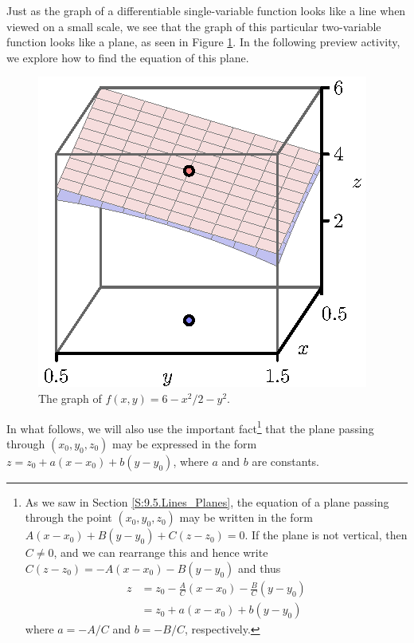 Just as the graph of a differentiable single-variable function looks like a line
when viewed on a small scale, we see that the graph of this particular two-variable
function looks like a plane, as seen in Figure \ref{F:10.4.tangent.4}.
In the following preview activity, we explore how to find the equation of this plane.

\begin{figure}[ht]
  \begin{center}
    \includegraphics{figures/fig_10_4_tangent_4.eps}
  \end{center}
  \caption{The graph of $f(x,y)=6-x^2/2 - y^2$.}
  \label{F:10.4.tangent.4}
\end{figure}

In what follows, we will also use the important fact\footnote{As we saw in Section \ref{S:9.5.Lines_Planes}, the equation
  of a plane passing through the point $(x_0, y_0, z_0)$ may be written
  in the form $A(x-x_0) + B(y-y_0) + C(z-z_0) = 0$.  If the
  plane is not vertical, then $C\neq 0$, and we can
  rearrange this and hence write
$
    C(z-z_0) = -A(x-x_0) - B(y-y_0) 
$
and thus
\begin{align*}
    z & = z_0-\frac AC(x-x_0) - \frac BC(y-y_0) \\
      & = z_0 + a(x-x_0) + b(y-y_0)
  \end{align*}
  where $a=-A/C$ and $b=-B/C$, respectively.} that the plane passing through $(x_0, y_0, z_0)$ may be expressed in the form
$z = z_0 + a(x-x_0) + b(y-y_0)$, where $a$ and $b$ are constants.


%

